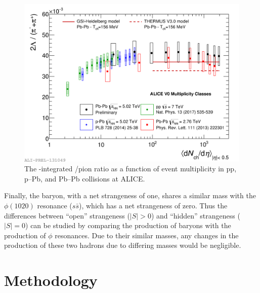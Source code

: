 \begin{figure}
\centering
\label{fig:lambda_enhancement}
\includegraphics[width=\textwidth]{figures/mnm/lambda_enhancement.png}
\caption{The \pt-integrated \lmb/pion ratio as a function of event multiplicity in pp, p--Pb, and Pb--Pb collisions at ALICE.}
\end{figure}

Finally, the \lmb baryon, with a net strangeness of one, shares a similar mass with the $\phi(1020)$ resonance ($s\bar{s}$), which has a net strangeness of zero. Thus the differences between ``open'' strangeness ($|S| > 0$) and ``hidden'' strangeness ($|S| = 0$) can be studied by comparing the production of \lmb baryons with the production of $\phi$ resonances. Due to their similar masses, any changes in the production of these two hadrons due to differing masses would be negligible.

\section{Methodology}

